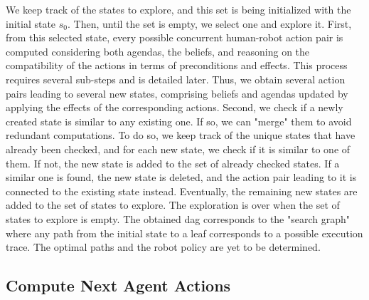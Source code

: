 We keep track of the states to explore, and this set is being initialized with the initial state $s_0$. Then, until the set is empty, we select one and explore it.
First, from this selected state, every possible concurrent human-robot action pair is computed considering both agendas, the beliefs, and reasoning on the compatibility of the actions in terms of preconditions and effects. This process requires several sub-steps and is detailed later. Thus, we obtain several action pairs leading to several new states, comprising beliefs and agendas updated by applying the effects of the corresponding actions.
Second, we check if a newly created state is similar to any existing one. If so, we can "merge" them to avoid redundant computations. To do so, we keep track of the unique states that have already been checked, and for each new state, we check if it is similar to one of them. 
If not, the new state is added to the set of already checked states. 
If a similar one is found, the new state is deleted, and the action pair leading to it is connected to the existing state instead.
Eventually, the remaining new states are added to the set of states to explore. 
The exploration is over when the set of states to explore is empty. The obtained \acrshort{dag} corresponds to the "search graph" where any path from the initial state to a leaf corresponds to a possible execution trace. The optimal paths and the robot policy are yet to be determined.

    \subsection{Compute Next Agent Actions}

